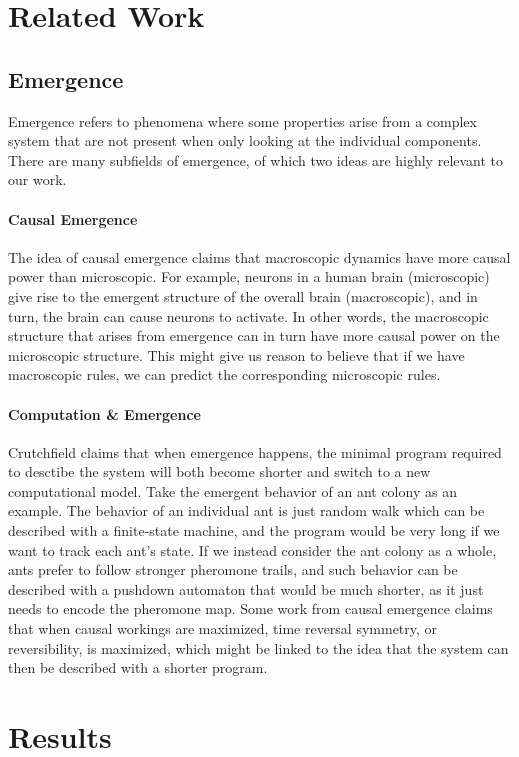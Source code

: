 \documentclass{article}
\begin{document}
\section{Related Work}

\subsection{Emergence}
Emergence refers to phenomena where some properties arise from a complex system that are not present when only looking at the individual components. There are many subfields of emergence, of which two ideas are highly relevant to our work.
\paragraph{Causal Emergence} The idea of causal emergence \cite{hoel_causal_2025} claims that macroscopic dynamics have more causal power than microscopic. 
For example, neurons in a human brain (microscopic) give rise to the emergent structure of the overall brain (macroscopic), 
and in turn, the brain can cause neurons to activate. 
In other words, the macroscopic structure that arises from emergence can in turn have more causal power on the microscopic structure. 
This might give us reason to believe that if we have macroscopic rules, we can predict the corresponding microscopic rules.
\paragraph{Computation \& Emergence} Crutchfield \cite{crutchfield_calculi_1994} claims that when emergence happens, the minimal program required to desctibe the system will both become shorter and switch to a new computational model. 
Take the emergent behavior of an ant colony as an example. The behavior of an individual ant is just random walk which can be described with a finite-state machine, and the program would be very long if we want to track each ant's state. 
If we instead consider the ant colony as a whole, ants prefer to follow stronger pheromone trails, and such behavior can be described with a pushdown automaton that would be much shorter, as it just needs to encode the pheromone map. 
Some work from causal emergence claims that when causal workings are maximized, time reversal symmetry, or reversibility, is maximized, which might be linked to the idea that the system can then be described with a shorter program.


\section{Results}
\end{document}
